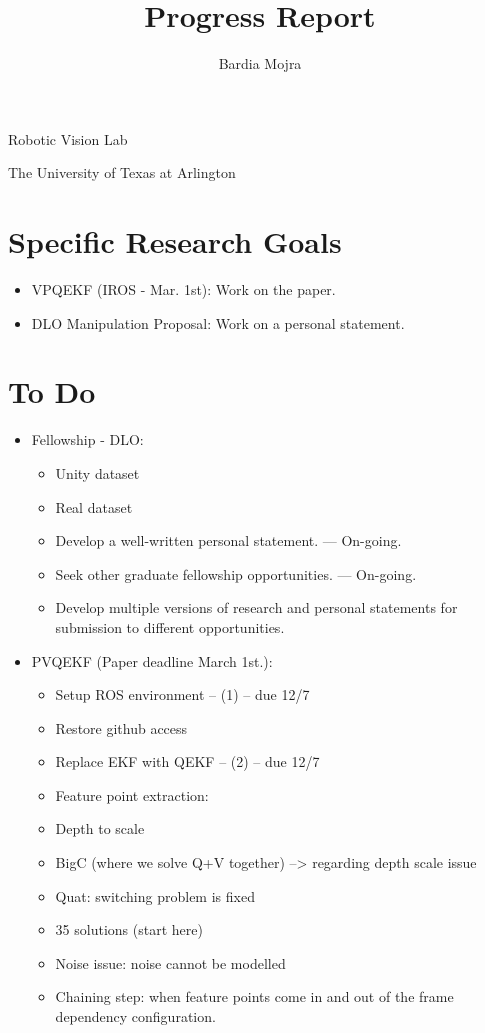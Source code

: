 \documentclass[11pt]{article}
\title{Progress Report}
\author{Bardia Mojra}
\begin{document}
\maketitle
\thispagestyle{empty}

\bigskip
\bigskip
\begin{center}
      Robotic Vision Lab
\end{center}

\begin{center}
      The University of Texas at Arlington
\end{center}

\newpage

\section{Specific Research Goals}
\begin{itemize}
      \item VPQEKF (IROS - Mar. 1st): Work on the paper.
      \item DLO Manipulation Proposal: Work on a personal statement.
\end{itemize}

\section{To Do}
\begin{itemize}
  \item Fellowship - DLO:
  \begin{itemize}
      \item Unity dataset
      \item Real dataset
      \item Develop a well-written personal statement. --- On-going.
      \item Seek other graduate fellowship opportunities. --- On-going.
      \item Develop multiple versions of research and personal statements for
      submission to different opportunities.
  \end{itemize}
  \item PVQEKF (Paper deadline March 1st.):
  \begin{itemize}
      \item Setup ROS environment -- (1) -- due 12/7
      \item Restore github access
      \item Replace EKF with QEKF -- (2) -- due 12/7
      \item Feature point extraction:
      \item Depth to scale
      \item BigC (where we solve Q+V together) --> regarding depth scale issue
      \item Quat: switching problem is fixed
      \item 35 solutions (start here)
      \item Noise issue: noise cannot be modelled
      \item Chaining step: when feature points come in and out of the frame dependency configuration.
  \end{itemize}
\end{itemize}
\end{document}
